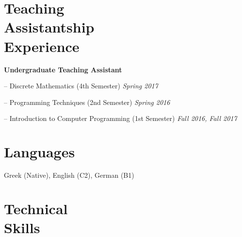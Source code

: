 \documentclass[margin, 10pt]{res}
\begin{document}
\begin{resume}
\section{Teaching \\ Assistantship \\ Experience} 
\textbf{Undergraduate Teaching Assistant}
\begin{compactitem}
    \item[--] Discrete Mathematics (4th Semester) \hfill \emph{Spring 2017}
    \item[--] Programming Techniques (2nd Semester) \hfill \emph{Spring 2016}
    \item[--] Introduction to Computer Programming (1st Semester) \hfill \emph{Fall 2016, Fall 2017}
\end{compactitem}



\section{Languages} Greek (Native), English (C2), German (B1)


\begin{comment}
\section{Data \\ Analysis \& \\ Visualization \\ Tools} 
\begin{compactitem}
\item[--] Python 
\item[--] Bash 
\item[--] MATLAB 
\item[--] GNU Octave 
\item[--] R
\item[--] Matplotlib 
\item[--] GNUPlot 
\item[--] Pandas
\item[--] Seaborn
\item[--] MySQL 
\item[--] MongoDB 
\end{compactitem}
\end{comment}

\section{Technical \\ Skills}


\end{resume}
\end{document}
